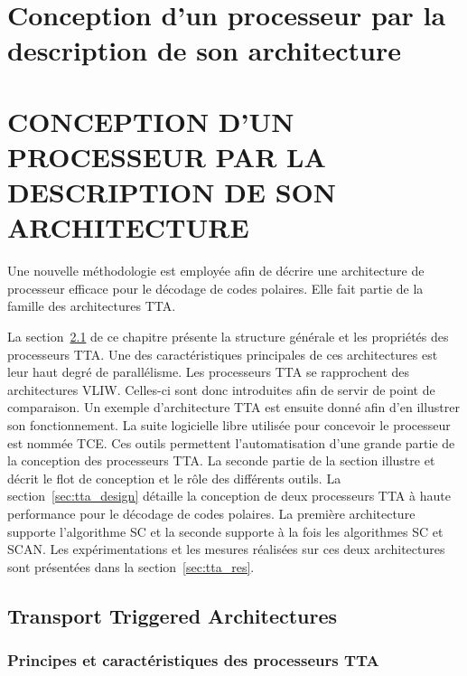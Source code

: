{
\chapter{Conception d'un processeur par la description de son architecture} %
\label{chap:tta}
}
{
\chapter{CONCEPTION D'UN PROCESSEUR PAR LA DESCRIPTION DE SON ARCHITECTURE} %
\label{chap:tta}
}


Une nouvelle méthodologie est employée afin de décrire une architecture de processeur efficace pour le décodage de codes polaires. Elle fait partie de la famille des architectures TTA.

La section~\ref{sec:tta_description} de ce chapitre présente la structure générale et les propriétés des processeurs TTA. Une des caractéristiques principales de ces architectures est leur haut degré de parallélisme. Les processeurs TTA se rapprochent des architectures VLIW. Celles-ci sont donc introduites afin de servir de point de comparaison. Un exemple d'architecture TTA est ensuite donné afin d'en illustrer son fonctionnement. La suite logicielle libre utilisée pour concevoir le processeur est nommée TCE. Ces outils permettent l'automatisation d'une grande partie de la conception des processeurs TTA. La seconde partie de la section illustre et décrit le flot de conception et le rôle des différents outils. La section~\ref{sec:tta_design} détaille la conception de deux processeurs TTA à haute performance pour le décodage de codes polaires. La première architecture supporte l'algorithme SC et la seconde supporte à la fois les algorithmes SC et SCAN. Les expérimentations et les mesures réalisées sur ces deux architectures sont présentées dans la section~\ref{sec:tta_res}.

{
\vspace*{\fill}
\minitocTITI
\vspace*{\fill}
\newpage
}
{
}

\section{Transport Triggered Architectures}
\label{sec:tta_description}

\subsection{Principes et caractéristiques des processeurs TTA}

